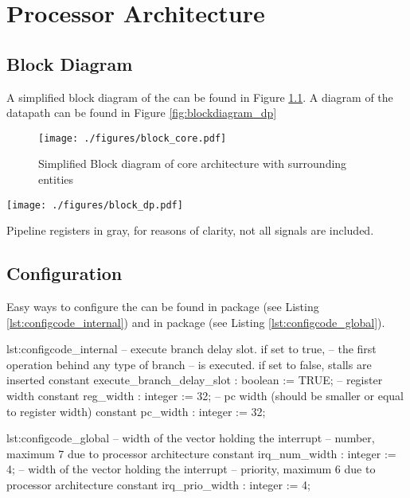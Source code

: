 \chapter{Processor Architecture}
\section{Block Diagram}
A simplified block diagram of the \procname can be found in Figure \ref{fig:blockdiagram_core}.
A diagram of the datapath can be found in Figure \ref{fig:blockdiagram_dp}

\begin{figure}[htb]
	\centering
	\texttt{[image: ./figures/block\_core.pdf]}
	\caption{Simplified Block diagram of core architecture with surrounding entities}
	\label{fig:blockdiagram_core}
\end{figure}
\begin{sidewaysfigure}[htb]
	\centering
	\texttt{[image: ./figures/block\_dp.pdf]}
	\caption{Block diagram of the datapath}
	\label{fig:blockdiagram_dp}
	Pipeline registers in gray, for reasons of clarity, not all signals are included.
\end{sidewaysfigure}

\section{Configuration}
\label{sec:config}
Easy ways to configure the \procname can be found in package  (see Listing \ref{lst:configcode_internal}) and in package  (see Listing \ref{lst:configcode_global}).

\begin{vhdl}{lst:configcode_internal}
-- execute branch delay slot. if set to true,
-- the first operation behind any type of branch
-- is executed. if set to false, stalls are inserted
constant execute_branch_delay_slot : boolean := TRUE;
-- register width
constant reg_width                 : integer := 32;
-- pc width (should be smaller or equal to register width)
constant pc_width                  : integer := 32;
\end{vhdl}

\begin{vhdl}{lst:configcode_global}
-- width of the vector holding the interrupt
-- number, maximum 7 due to processor architecture
constant irq_num_width             : integer := 4;
-- width of the vector holding the interrupt
-- priority, maximum 6 due to processor architecture
constant irq_prio_width            : integer := 4;
\end{vhdl}

